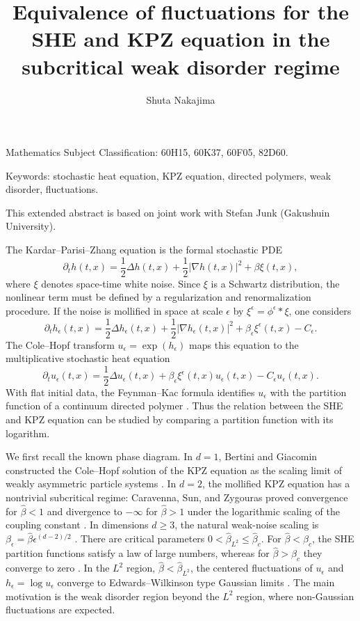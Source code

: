 \documentclass[12pt,centertags,oneside]{amsart}
\title[]{Equivalence of fluctuations for the SHE and KPZ equation in the subcritical weak disorder regime}
\author{Shuta Nakajima}
\date{}
\numberwithin{equation}{section}
\begin{document}
\maketitle
\thispagestyle{empty}

\medskip

 Mathematics Subject Classification: 60H15, 60K37, 60F05, 82D60.

\medskip

\noindent Keywords: stochastic heat equation, KPZ equation, directed polymers, weak disorder, fluctuations.

\medskip

This extended abstract is based on joint work with Stefan Junk (Gakushuin University).

\medskip

The Kardar--Parisi--Zhang equation is the formal stochastic PDE
$$
\partial_t h(t,x)=\frac12\Delta h(t,x)+\frac12|\nabla h(t,x)|^2+\beta \xi(t,x),
$$
where $\xi$ denotes space-time white noise. Since $\xi$ is a Schwartz distribution, the nonlinear term must be defined by a regularization and renormalization procedure. If the noise is mollified in space at scale $\epsilon$ by $\xi^\epsilon=\phi^\epsilon*\xi$, one considers
$$
\partial_t h_\epsilon(t,x)=\frac12\Delta h_\epsilon(t,x)+\frac12|\nabla h_\epsilon(t,x)|^2
+\beta_\epsilon \xi^\epsilon(t,x)-C_\epsilon.
$$
The Cole--Hopf transform $u_\epsilon=\exp(h_\epsilon)$ maps this equation to the multiplicative stochastic heat equation
$$
\partial_t u_\epsilon(t,x)=\frac12\Delta u_\epsilon(t,x)+\beta_\epsilon \xi^\epsilon(t,x)u_\epsilon(t,x)-C_\epsilon u_\epsilon(t,x).
$$
With flat initial data, the Feynman--Kac formula identifies $u_\epsilon$ with the partition function of a continuum directed polymer \cite{MukherjeeShamovZeitouni2016}. Thus the relation between the SHE and KPZ equation can be studied by comparing a partition function with its logarithm.

We first recall the known phase diagram. In $d=1$, Bertini and Giacomin constructed the Cole--Hopf solution of the KPZ equation as the scaling limit of weakly asymmetric particle systems \cite{BertiniGiacomin1997}. In $d=2$, the mollified KPZ equation has a nontrivial subcritical regime: Caravenna, Sun, and Zygouras proved convergence for $\hat\beta<1$ and divergence to $-\infty$ for $\hat\beta>1$ under the logarithmic scaling of the coupling constant \cite{CaravennaSunZygouras2020}. In dimensions $d\geq 3$, the natural weak-noise scaling is $\beta_\epsilon=\hat\beta\epsilon^{(d-2)/2}$ \cite{MukherjeeShamovZeitouni2016,CoscoNakajimaNakashima2022}. There are critical parameters $0<\hat\beta_{L^2}\leq \hat\beta_c$. For $\hat\beta<\hat\beta_c$, the SHE partition functions satisfy a law of large numbers, whereas for $\hat\beta>\hat\beta_c$ they converge to zero \cite{MukherjeeShamovZeitouni2016,CoscoNakajimaNakashima2022}. In the $L^2$ region, $\hat\beta<\hat\beta_{L^2}$, the centered fluctuations of $u_\epsilon$ and $h_\epsilon=\log u_\epsilon$ converge to Edwards--Wilkinson type Gaussian limits \cite{GuRyzhikZeitouni2018,CoscoNakajimaNakashima2022}. The main motivation is the weak disorder region beyond the $L^2$ region, where non-Gaussian fluctuations are expected.
\end{document}
